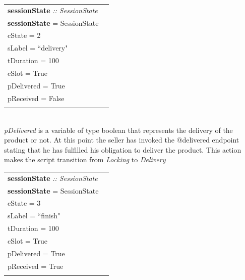 \documentclass[12pt]{article}
\begin{document}
\begin{tabular}{lr}
\textbf{sessionState} \emph{:: SessionState}\\
\textbf{sessionState}  = SessionState  \textbraceleft{}
\\ \hspace{55mm}cState = 2
\\ \hspace{55mm}sLabel = ``delivery"
\\ \hspace{55mm}tDuration = 100
\\ \hspace{55mm}cSlot = True
\\ \hspace{55mm}pDelivered = True
\\ \hspace{55mm}pReceived = False
\\\hspace{51mm}\textbraceright{} 
\end{tabular}
\\

\emph{pDelivered} is a variable of type boolean that represents the delivery of the product or not. 
At this point the seller has invoked the @delivered endpoint stating that he has fulfilled his obligation to deliver the product. This action makes the script transition from \emph{Locking} to \emph{Delivery}
\\

\begin{tabular}{lr}
\textbf{sessionState} \emph{:: SessionState}\\
\textbf{sessionState}  = SessionState  \textbraceleft{}
\\ \hspace{55mm}cState = 3
\\ \hspace{55mm}sLabel = ``finish"
\\ \hspace{55mm}tDuration = 100
\\ \hspace{55mm}cSlot = True
\\ \hspace{55mm}pDelivered = True
\\ \hspace{55mm}pReceived = True
\\\hspace{51mm}\textbraceright{} 
\end{tabular}
\\
\end{document}
